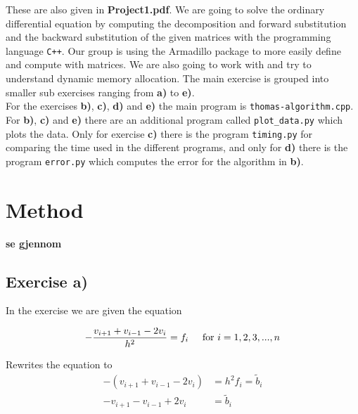 \documentclass{article}
\begin{document}
These are also given in \textbf{Project1.pdf}. We are going to solve the ordinary differential equation by computing the decomposition and forward substitution and the backward substitution of the given matrices with the programming language \texttt{C++}. Our group is using the Armadillo package to more easily define and compute with matrices. We are also going to work with and try to understand dynamic memory allocation. The main exercise is grouped into smaller sub exercises ranging from \textbf{a)} to \textbf{e)}. \\

For the exercises \textbf{b)}, \textbf{c)}, \textbf{d)} and \textbf{e)} the main program is \texttt{thomas-algorithm.cpp}. For \textbf{b)}, \textbf{c)} and \textbf{e)} there are an additional program called \texttt{plot\_data.py} which plots the data. Only for exercise \textbf{c)} there is the program \texttt{timing.py} for comparing the time used in the different programs, and only for \textbf{d)} there is the program \texttt{error.py} which computes the error for the algorithm in \textbf{b)}. \\

\vspace{3mm}


\vspace{1cm}

\section{Method}

  {\large \bf se gjennom} \\

\subsection{Exercise a)}

  In the exercise we are given the equation

  \begin{equation*}
    - \frac{v_{i+1} + v_{i-1} - 2 v_i}{h^2} = f_i \hspace{5mm} \textrm{for} ~  i = 1, 2, 3, ... , n
  \end{equation*}

  Rewrites the equation to
  \begin{align*}
    - (v_{i+1} + v_{i-1} - 2 v_i) &= h^2 f_i = \tilde{b}_i \\
    - v_{i+1} - v_{i-1} + 2 v_i &= \tilde{b}_i
  \end{align*}
\end{document}
